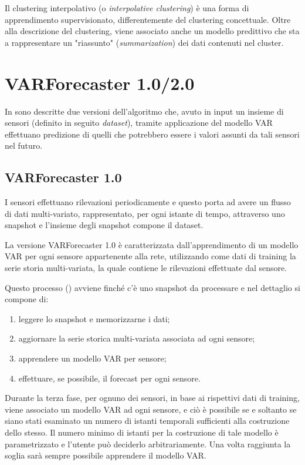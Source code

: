 \documentclass[12pt,a4paper,oneside,openright]{book}
\begin{document}
Il clustering interpolativo (o \textit{interpolative clustering}) è una forma di apprendimento supervisionato, differentemente del clustering concettuale. Oltre alla descrizione del clustering, viene associato anche un modello predittivo che sta a rappresentare un "riassunto" (\textit{summarization}) dei dati contenuti nel cluster.
\newpage
\section{VARForecaster 1.0/2.0}
In \cite{donato} sono descritte due versioni dell'algoritmo che, avuto in input un insieme di sensori (definito in seguito \textit{dataset}), tramite applicazione del modello VAR effettuano predizione di quelli che potrebbero essere i valori assunti da tali sensori nel futuro. 


\subsection{VARForecaster 1.0}
I sensori effettuano rilevazioni periodicamente e questo porta ad avere un flusso di dati multi-variato, rappresentato, per ogni istante di tempo, attraverso uno snapshot e l'insieme degli snapshot compone il dataset. 

La versione VARForecaster 1.0 è caratterizzata dall'apprendimento di un modello VAR per ogni sensore appartenente alla rete, utilizzando come dati di training la serie storia multi-variata, la quale contiene le rilevazioni effettuate dal sensore.

Questo processo (\cite{donato}) avviene finché c'è uno snapshot da processare e nel dettaglio si compone di:
\begin{enumerate}
\item leggere lo snapshot e memorizzarne i dati;
\item aggiornare la serie storica multi-variata associata ad ogni sensore;
\item apprendere un modello VAR per sensore;
\item effettuare, se possibile, il forecast per ogni sensore.
\end{enumerate}
Durante la terza fase, per ognuno dei sensori, in base ai rispettivi dati di training, viene associato un modello VAR ad ogni sensore, e ciò è possibile se e soltanto se siano stati esaminato un numero di istanti temporali sufficienti alla costruzione dello stesso. Il numero minimo di istanti per la costruzione di tale modello è parametrizzato e l'utente può deciderlo arbitrariamente. Una volta raggiunta la soglia sarà sempre possibile apprendere il modello VAR.
\end{document}
